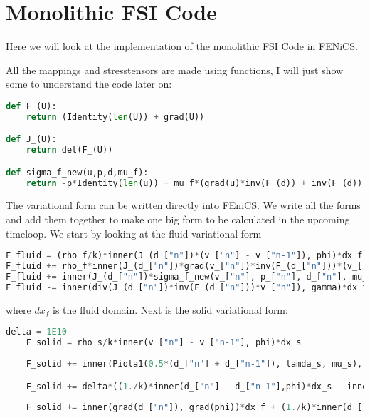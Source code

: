 \chapter*{Monolithic FSI Code}
Here we will look at the implementation of the monolithic FSI Code in FENiCS. 





All the mappings and stresstensors are made using functions, I will just show some to understand the code later on:

\begin{lstlisting}[language=Python]
def F_(U):
	return (Identity(len(U)) + grad(U))

def J_(U):
	return det(F_(U))

def sigma_f_new(u,p,d,mu_f):
	return -p*Identity(len(u)) + mu_f*(grad(u)*inv(F_(d)) + inv(F_(d)).T*grad(u).T)

\end{lstlisting}

The variational form can be written directly into FEniCS. We write all the forms and add them together to make one big form to be calculated in the upcoming timeloop. We start by looking at the fluid variational form
\begin{lstlisting}[language=Python]
F_fluid = (rho_f/k)*inner(J_(d_["n"])*(v_["n"] - v_["n-1"]), phi)*dx_f
F_fluid += rho_f*inner(J_(d_["n"])*grad(v_["n"])*inv(F_(d_["n"]))*(v_["n"] - (d_["n"]-d_["n-1"])/k), phi)*dx_f
F_fluid += inner(J_(d_["n"])*sigma_f_new(v_["n"], p_["n"], d_["n"], mu_f)*inv(F_(d_["n"])).T, grad(phi))*dx_f
F_fluid -= inner(div(J_(d_["n"])*inv(F_(d_["n"]))*v_["n"]), gamma)*dx_f
\end{lstlisting}

where $dx_f$ is the fluid domain.
Next is the solid variational form:
\begin{lstlisting}[language=Python]
delta = 1E10
	F_solid = rho_s/k*inner(v_["n"] - v_["n-1"], phi)*dx_s
	
	F_solid += inner(Piola1(0.5*(d_["n"] + d_["n-1"]), lamda_s, mu_s), grad(phi))*dx_s

	F_solid += delta*((1./k)*inner(d_["n"] - d_["n-1"],phi)*dx_s - inner(0.5*(v_["n"] + v_["n-1"]), psi)*dx_s)
	
	F_solid += inner(grad(d_["n"]), grad(phi))*dx_f + (1./k)*inner(d_["n"] - d_["n-1"], psi)*dx_f
\end{lstlisting}

